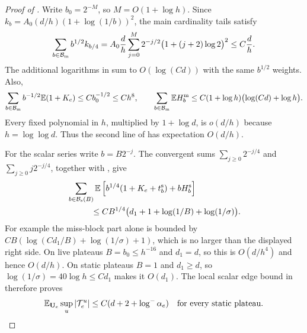\begin{proof}[Proof of ]
Write $b_0=2^{-M}$, so $M=O(1+\log h)$.  Since
$k_b=A_0(d/h)(1+\log(1/b))^2$, the main cardinality tails satisfy
\begin{equation}\label{eq:09-main-series}
 \sum_{b\in\mathcal B_{\rm m}}b^{1/2}k_{b/4}
 =A_0\frac dh\sum_{j=0}^{M}2^{-j/2}
                          \bigl(1+(j+2)\log2\bigr)^2
 \le C\frac dh.
\end{equation}
The additional logarithms in  sum to
$O(\log(Cd))$ with the same $b^{1/2}$ weights.  Also,
\[
 \sum_{b\in\mathcal B_{\rm m}}b^{-1/2}\mathbb E(1+K_e)
       \le Cb_0^{-1/2}\le Ch^8,
 \qquad
 \sum_{b\in\mathcal B_{\rm m}}\mathbb E H_b^{\rm m}
       \le C(1+\log h)\bigl(\log(Cd)+\log h\bigr).
\]
Every fixed polynomial in $h$, multiplied by $1+\log d$, is
$o(d/h)$ because $h=\log\log d$.  Thus the second line of
 has expectation $O(d/h)$.

For the scalar series write $b=B2^{-j}$.  The convergent sums
$\sum_{j\ge0}2^{-j/4}$ and $\sum_{j\ge0}j2^{-j/4}$, together with
, give
\begin{align}
 &\sum_{b\in\mathcal B_{\rm s}(B)}
  \mathbb E\left[b^{1/4}(1+K_e+t_b^{\rm s})+bH_b^{\rm s}\right]\notag\\
 &\hspace{1cm}\le
 C B^{1/4}\bigl(d_1+1+\log(1/B)+\log(1/\sigma)\bigr).
 \label{eq:09-scalar-series}
\end{align}
For example the miss-block part alone is bounded by
$CB(\log(Cd_1/B)+\log(1/\sigma)+1)$, which is no larger than the
displayed right side.  On live plateaus $B=b_0\le h^{-16}$ and $d_1=d$,
so this is $O(d/h^4)$ and hence $O(d/h)$.  On static plateaus $B=1$ and
$d_1\ge d$, so $\log(1/\sigma)=40\log h\le Cd_1$ makes it $O(d_1)$.
The local scalar edge bound in  therefore proves
\begin{equation}\label{eq:09-static-plateau}
 \mathbb E_{\mathbf U_e}\sup_u|\mathcal T_e^u|\le C(d+2+\log^-\alpha_e)
 \quad\text{for every static plateau.}
\end{equation}


\end{proof}
